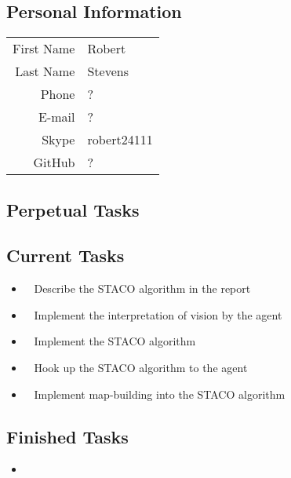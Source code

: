 \subsection{Personal Information}
\begin{table}[h!]
	\begin{tabular}{rl}
	First Name 	& Robert\\
	Last Name	& Stevens\\
	Phone		& ?\\
	E-mail		& ?\\
	Skype		& robert24111\\
	GitHub		& ?
\end{tabular}
\end{table}

\subsection{Perpetual Tasks}

\subsection{Current Tasks}
\begin{itemize}
	\item~
	Describe the STACO algorithm in the report
	\item~
	Implement the interpretation of vision by the agent
	\item~
	Implement the STACO algorithm
	\item~
	Hook up the STACO algorithm to the agent
	\item~
	Implement map-building into the STACO algorithm
\end{itemize}

\subsection{Finished Tasks}
\begin{itemize}
	\item
\end{itemize}